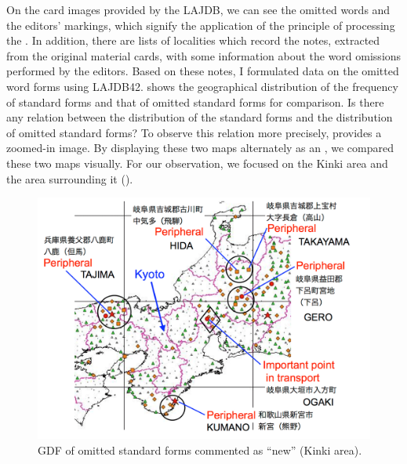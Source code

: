 \documentclass[output=paper]{LSP/langsci}
\begin{document}
On the card images provided by the LAJDB, we can see the omitted words and the editors’ markings, which signify the application of the principle of processing the . In addition, there are lists of localities which record the notes, extracted from the original material cards, with some information about the word omissions performed by the editors. Based on these notes, I formulated data on the omitted word forms using LAJDB42.  shows the geographical distribution of the frequency of standard forms and that of omitted standard forms for comparison. Is there any relation between the distribution of the standard forms and the distribution of omitted standard forms? To observe this relation more precisely,  provides a zoomed-in image. By displaying these two maps alternately as an , we compared these two maps visually. For our observation, we focused on the Kinki area and the area surrounding it (). 

\begin{figure}
\includegraphics[height=.4\textheight]{illustrations/kuma_fig18}
\caption{GDF of omitted standard forms commented as “new” (Kinki area).}          
\label{fig:kuma:18}
\end{figure}
\end{document}

